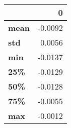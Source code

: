 \begin{tabular}{lr}
\toprule
{} &       0 \\
\midrule
\textbf{mean} & -0.0092 \\
\textbf{std } &  0.0056 \\
\textbf{min } & -0.0137 \\
\textbf{25\% } & -0.0129 \\
\textbf{50\% } & -0.0128 \\
\textbf{75\% } & -0.0055 \\
\textbf{max } & -0.0012 \\
\bottomrule
\end{tabular}
